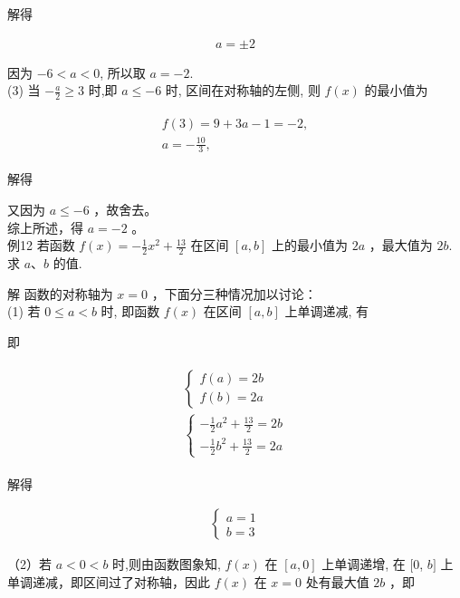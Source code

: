 \documentclass[10pt]{article}
\begin{document}
解得

\begin{align*}
a= \pm 2
\end{align*}

因为 $-6<a<0$, 所以取 $a=-2$.\\
(3) 当 $-\frac{a}{2} \geqslant 3$ 时,即 $a \leqslant-6$ 时, 区间在对称轴的左侧, 则 $f(x)$ 的最小值为

\begin{align*}
\begin{gathered}
f(3)=9+3 a-1=-2, \\
a=-\frac{10}{3},
\end{gathered}
\end{align*}

解得

又因为 $a \leqslant-6$ ，故舍去。\\
综上所述，得 $a=-2$ 。\\
例12 若函数 $f(x)=-\frac{1}{2} x^{2}+\frac{13}{2}$ 在区间 $[a, b]$ 上的最小值为 $2 a$ ，最大值为 $2 b$. 求 $a 、 b$ 的值.

解 函数的对称轴为 $x=0$ ，下面分三种情况加以讨论：\\
(1) 若 $0 \leqslant a<b$ 时, 即函数 $f(x)$ 在区间 $[a, b]$ 上单调递减, 有

即

\begin{align*}
\begin{gathered}
\left\{\begin{array}{l}
f(a)=2 b \\
f(b)=2 a
\end{array}\right. \\
\left\{\begin{array}{l}
-\frac{1}{2} a^{2}+\frac{13}{2}=2 b \\
-\frac{1}{2} b^{2}+\frac{13}{2}=2 a
\end{array}\right.
\end{gathered}
\end{align*}

解得

\begin{align*}
\left\{\begin{array}{l}
a=1 \\
b=3
\end{array}\right.
\end{align*}

（2）若 $a<0<b$ 时,则由函数图象知, $f(x)$ 在 $[a, 0]$ 上单调递增, 在 $[0$, $b]$ 上单调递减，即区间过了对称轴，因此 $f(x)$ 在 $x=0$ 处有最大值 $2 b$ ，即
\end{document}
